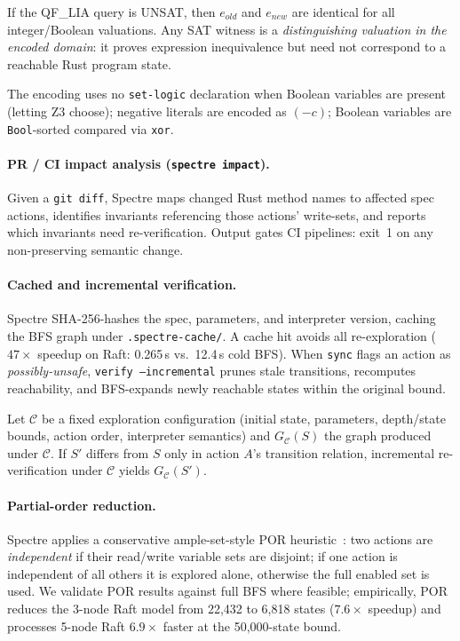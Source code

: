 \documentclass[runningheads]{../paper-vmcai-2027/llncs}
\begin{document}
\begin{proposition}\label{prop:smt}
If the QF\_LIA query is UNSAT, then $e_{\mathit{old}}$ and $e_{\mathit{new}}$
are identical for all integer/Boolean valuations.
Any SAT witness is a \emph{distinguishing valuation in the encoded domain}:
it proves expression inequivalence but need not correspond to a reachable
Rust program state.
\end{proposition}

The encoding uses no \texttt{set-logic} declaration when Boolean variables are
present (letting Z3 choose); negative literals are encoded as $(- c)$;
Boolean variables are \texttt{Bool}-sorted compared via \texttt{xor}.

\paragraph{PR / CI impact analysis (\texttt{spectre impact}).}
Given a \texttt{git diff}, Spectre maps changed Rust method names to affected
spec actions, identifies invariants referencing those actions' write-sets, and
reports which invariants need re-verification.
Output gates CI pipelines: exit~1 on any non-preserving semantic change.

\paragraph{Cached and incremental verification.}
Spectre SHA-256-hashes the spec, parameters, and interpreter version, caching
the BFS graph under \texttt{.spectre-cache/}.
A cache hit avoids all re-exploration ($47\times$ speedup on Raft:
0.265\,s vs.\ 12.4\,s cold BFS).
When \texttt{sync} flags an action as \emph{possibly-unsafe},
\texttt{verify --incremental} prunes stale transitions, recomputes reachability,
and BFS-expands newly reachable states within the original bound.

\begin{proposition}\label{prop:incremental}
Let $\mathcal{C}$ be a fixed exploration configuration (initial state,
parameters, depth/state bounds, action order, interpreter semantics) and
$G_{\mathcal{C}}(S)$ the graph produced under $\mathcal{C}$.
If $S'$ differs from $S$ only in action $A$'s transition relation,
incremental re-verification under $\mathcal{C}$ yields $G_{\mathcal{C}}(S')$.
\end{proposition}

\paragraph{Partial-order reduction.}
Spectre applies a conservative ample-set-style POR
heuristic~\cite{9_holzmann2003spin}: two actions are \emph{independent} if
their read/write variable sets are disjoint; if one action is independent
of all others it is explored alone, otherwise the full enabled set is used.
We validate POR results against full BFS where feasible; empirically,
POR reduces the 3-node Raft model from 22{,}432 to 6{,}818 states
($7.6\times$ speedup) and processes 5-node Raft $6.9\times$ faster at the
50{,}000-state bound.
\end{document}
